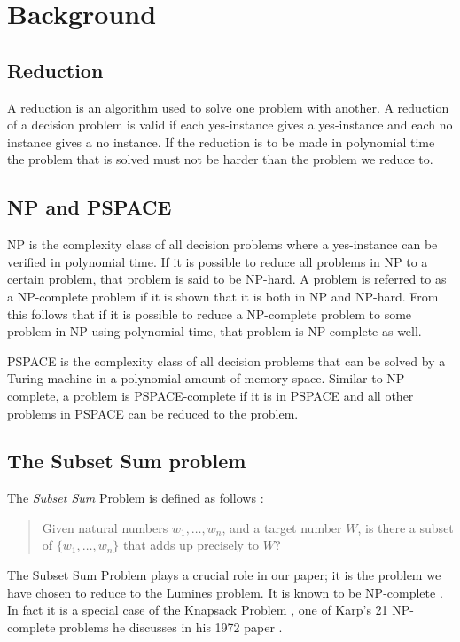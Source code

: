 \section{Background}

\subsection{Reduction}
A reduction is an algorithm used to solve one problem with another. A reduction of a decision problem is valid if each yes-instance gives a yes-instance and each no instance gives a no instance. If the reduction is to be made in polynomial time the problem that is solved must not be harder than the problem we reduce to.\cite{reduction}

\subsection{NP and PSPACE}
NP is the complexity class of all decision problems where a yes-instance can be verified in polynomial time. If it is possible to reduce all problems in NP to a certain problem, that problem is said to be NP-hard. A problem is referred to as a NP-complete problem if it is shown that it is both in NP and NP-hard. From this follows that if it is possible to reduce a NP-complete problem to some problem in NP using polynomial time, that problem is NP-complete as well.

PSPACE is the complexity class of all decision problems that can be solved by a Turing machine in a polynomial amount of memory space. Similar to NP-complete, a problem is PSPACE-complete if it is in PSPACE and all other problems in PSPACE can be reduced to the problem.

\subsection{The Subset Sum problem}

The \textit{Subset Sum} Problem is defined as follows \cite[p.~491]{algorithm}:

\begin{quote}
Given natural numbers $w_1, \ldots, w_n$, and a target number $W$, is there a subset of $\{w_1, \ldots, w_n \}$ that adds up precisely to $W$?
\end{quote}

The Subset Sum Problem plays a crucial role in our paper; it is the problem we have chosen to reduce to the Lumines problem. It is known to be NP-complete \cite[p.~492]{algorithm}. In fact it is a special case of the Knapsack Problem \cite[p.~491]{algorithm}, one of Karp's 21 NP-complete problems he discusses in his 1972 paper \cite{karp}.

